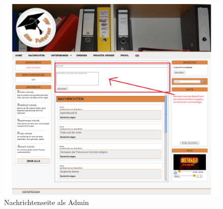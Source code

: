 \begin{figure}[!htbp]
 \centering
 \includegraphics[width=1\textwidth]{../Screenshots/de/Nachrichten_admin}
 \caption{Nachrichtenseite als Admin}
 \label{fig:Nachrichten_admin}
\end{figure}
